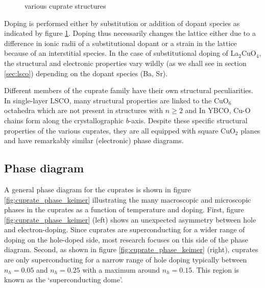 \begin{figure}
    \centering
    \caption[various cuprate structures]{various cuprate structures}
    \label{fig:cuprate_family_structures}
\end{figure}

Doping is performed either by substitution or addition of dopant species as indicated by figure \ref{fig:cuprate_family_structures}. Doping thus necessarily changes the lattice either due to a difference in ionic radii of a substitutional dopant or a strain in the lattice because of an interstitial species. In the case of substitutional doping of La$_2$CuO$_4$, the structural and electronic properties vary wildly (as we shall see in section \ref{sec:lsco}) depending on the dopant species (Ba, Sr).

Different members of the cuprate family have their own structural peculiarities. In single-layer LSCO, many structural properties are linked to the CuO$_6$ octahedra which are not present in structures with $n \geq 2$ and In YBCO, Cu-O chains form along the crystallographic $b$-axis. Despite these specific structural properties of the various cuprates, they are all equipped with square CuO$_2$ planes and have remarkably similar (electronic) phase diagrams.

\subsection{Phase diagram}
A general phase diagram for the cuprates is shown in figure \ref{fig:cuprate_phase_keimer} illustrating the many macroscopic and microscopic phases in the cuprates as a function of temperature and doping. First, figure \ref{fig:cuprate_phase_keimer} (left) shows an unexpected asymmetry between hole and electron-doping. Since cuprates are superconducting for a wider range of doping on the hole-doped side, most research focuses on this side of the phase diagram. Second, as shown in figure \ref{fig:cuprate_phase_keimer} (right), cuprates are only superconducting for a narrow range of hole doping typically between $n_h = 0.05$ and $n_h = 0.25$ with a maximum around $n_h = 0.15$. This region is known as the `superconducting dome'. 

